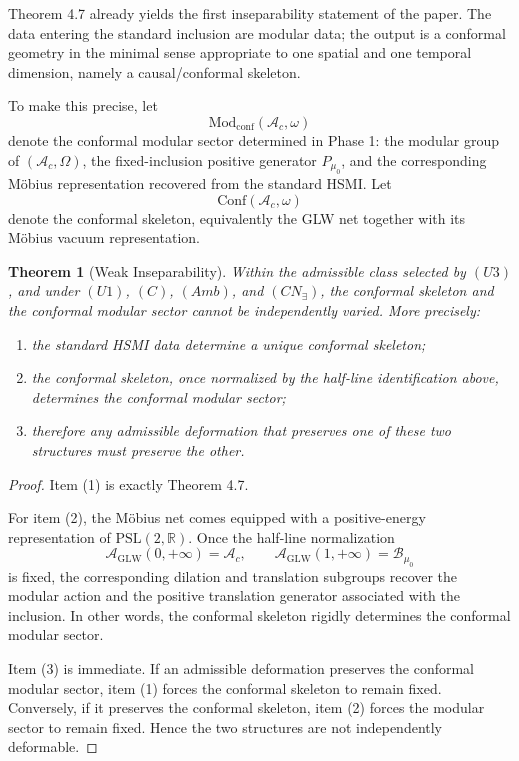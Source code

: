 \documentclass[12pt]{article}
\newtheorem{theorem}{Theorem}[section]
\theoremstyle{definition}
\theoremstyle{remark}
\newcommand{\tightlist}{%
  \setlength{\itemsep}{0pt}\setlength{\parskip}{0pt}}
\begin{document}
Theorem 4.7 already yields the first inseparability statement of the
paper. The data entering the standard inclusion are modular data; the
output is a conformal geometry in the minimal sense appropriate to one
spatial and one temporal dimension, namely a causal/conformal skeleton.

To make this precise, let \[
\mathrm{Mod}_{\mathrm{conf}}(\mathcal{A}_c,\omega)
\] denote the conformal modular sector determined in Phase 1: the
modular group of \((\mathcal{A}_c,\Omega)\), the fixed-inclusion
positive generator \(P_{\mu_0}\), and the corresponding Möbius
representation recovered from the standard HSMI\@. Let \[
\mathrm{Conf}(\mathcal{A}_c,\omega)
\] denote the conformal skeleton, equivalently the GLW net together with
its Möbius vacuum representation.

\begin{theorem}[Weak Inseparability]\label{thm:4.8}
Within the admissible class selected by \((U3)\), and under \((U1)\),
\((C)\), \((Amb)\), and \((CN_\exists)\), the conformal skeleton and the
conformal modular sector cannot be independently varied. More precisely:

\begin{enumerate}
\def\labelenumi{\arabic{enumi}.}
\tightlist
\item
  the standard HSMI data determine a unique conformal skeleton;
\item
  the conformal skeleton, once normalized by the half-line
  identification above, determines the conformal modular sector;
\item
  therefore any admissible deformation that preserves one of these two
  structures must preserve the other.
\end{enumerate}
\end{theorem}

\begin{proof}
Item (1) is exactly Theorem 4.7.

For item (2), the Möbius net comes equipped with a positive-energy
representation of \(\mathrm{PSL}(2,\mathbb{R})\). Once the half-line
normalization \[
\mathcal{A}_{\mathrm{GLW}}(0,+\infty)=\mathcal{A}_c,
\qquad
\mathcal{A}_{\mathrm{GLW}}(1,+\infty)=\mathcal{B}_{\mu_0}
\] is fixed, the corresponding dilation and translation subgroups
recover the modular action and the positive translation generator
associated with the inclusion. In other words, the conformal skeleton
rigidly determines the conformal modular sector.

Item (3) is immediate. If an admissible deformation preserves the
conformal modular sector, item (1) forces the conformal skeleton to
remain fixed. Conversely, if it preserves the conformal skeleton, item
(2) forces the modular sector to remain fixed. Hence the two structures
are not independently deformable.
\end{proof}
\end{document}
